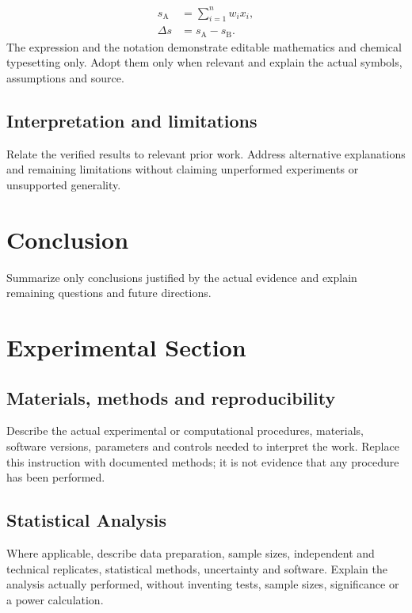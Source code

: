 \documentclass[a4paper,11pt]{article}
\begin{document}
\begin{equation}
\begin{split}
 s_{\mathrm{A}} &= \sum_{i=1}^{n} w_i x_i,\\
 \Delta s &= s_{\mathrm{A}}-s_{\mathrm{B}}.
\end{split}\label{eq:illustration}
\end{equation}
The expression and the notation  demonstrate editable mathematics
and chemical typesetting only. Adopt them only when relevant and explain
the actual symbols, assumptions and source.

\subsection{Interpretation and limitations}
Relate the verified results to relevant prior work. Address alternative
explanations and remaining limitations without claiming unperformed
experiments or unsupported generality.

\section{Conclusion}\label{sec:conclusion}
Summarize only conclusions justified by the actual evidence and explain
remaining questions and future directions.

\section{Experimental Section}\label{sec:methods}
\subsection{Materials, methods and reproducibility}
Describe the actual experimental or computational procedures, materials,
software versions, parameters and controls needed to interpret the work.
Replace this instruction with documented methods; it is not evidence that
any procedure has been performed.

\subsection{Statistical Analysis}\label{sec:statistics}
Where applicable, describe data preparation, sample sizes, independent and
technical replicates, statistical methods, uncertainty and software.
Explain the analysis actually performed, without inventing tests, sample
sizes, significance or a power calculation.
\end{document}
